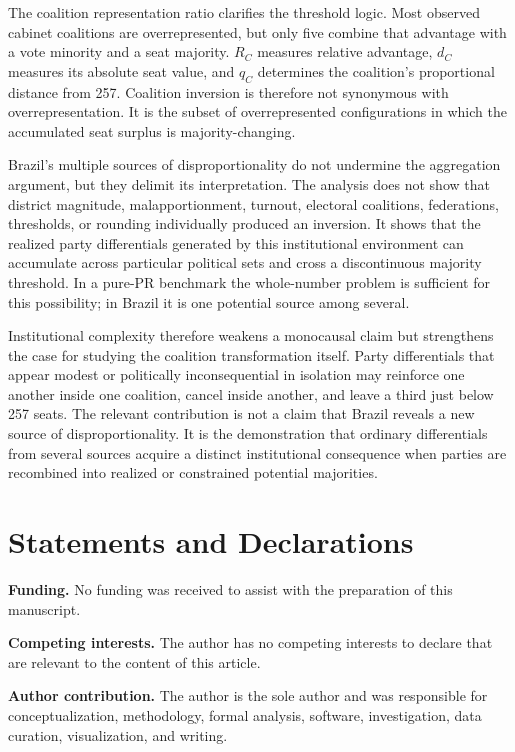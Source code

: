 \documentclass[11pt]{article}
\begin{document}
The coalition representation ratio clarifies the threshold logic. Most observed
cabinet coalitions are overrepresented, but only five combine that advantage
with a vote minority and a seat majority. \(R_C\) measures relative advantage,
\(d_C\) measures its absolute seat value, and \(q_C\) determines the
coalition's proportional distance from 257. Coalition inversion is therefore
not synonymous with overrepresentation. It is the subset of overrepresented
configurations in which the accumulated seat surplus is majority-changing.

Brazil's multiple sources of disproportionality do not undermine the
aggregation argument, but they delimit its interpretation. The analysis does
not show that district magnitude, malapportionment, turnout, electoral
coalitions, federations, thresholds, or rounding individually produced an
inversion. It shows that the realized party differentials generated by this
institutional environment can accumulate across particular political sets and
cross a discontinuous majority threshold. In a pure-PR benchmark the
whole-number problem is sufficient for this possibility; in Brazil it is one
potential source among several.

Institutional complexity therefore weakens a monocausal claim but strengthens
the case for studying the coalition transformation itself. Party differentials
that appear modest or politically inconsequential in isolation may reinforce
one another inside one coalition, cancel inside another, and leave a third just
below 257 seats. The relevant contribution is not a claim that Brazil reveals
a new source of disproportionality. It is the demonstration that ordinary
differentials from several sources acquire a distinct institutional consequence
when parties are recombined into realized or constrained potential majorities.

\section*{Statements and Declarations}  

\textbf{Funding.} No funding was received to assist with the preparation of this manuscript.

\textbf{Competing interests.} The author has no competing interests to declare that are relevant to the content of this article.

\textbf{Author contribution.} The author is the sole author and was responsible for conceptualization, methodology, formal analysis, software, investigation, data curation, visualization, and writing.
\end{document}
